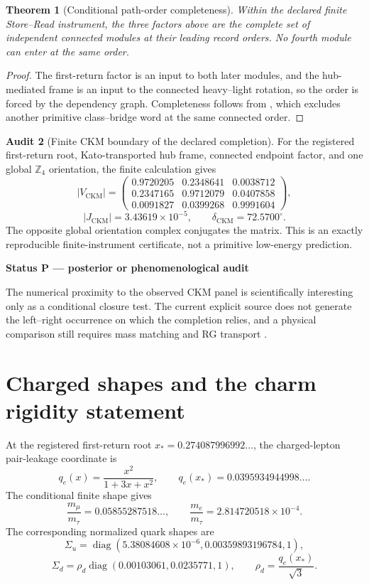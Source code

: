 \documentclass[11pt,oneside,openany]{book}
\numberwithin{equation}{chapter}
\newtheorem{theorem}{Theorem}[chapter]
\theoremstyle{definition}
\newtheorem{audit}[theorem]{Audit}
\theoremstyle{remark}
\newcommand{\diag}{\operatorname{diag}}
\newcommand{\Zfour}{\mathbb Z_4}
\newcommand{\CKM}{\mathrm{CKM}}
\newenvironment{statusbox}[2]{%
  \par\medskip\noindent
  \begin{center}\begin{minipage}{0.94\textwidth}
  \colorbox{#1!8}{\parbox{\dimexpr\linewidth-2\fboxsep\relax}{\textbf{#2}}}\par\smallskip
}{%
  \end{minipage}\end{center}\medskip
}
\newcommand{\Posterior}[1]{\begin{statusbox}{PostColor}{Status P --- posterior or phenomenological audit}#1\end{statusbox}}
\begin{document}
\begin{theorem}[Conditional path-order completeness]
\label{thm:conditional-ckm-order}
Within the declared finite Store--Read instrument, the three factors above
are the complete set of independent connected modules at their leading
record orders.  No fourth module can enter at the same order.
\end{theorem}

\begin{proof}
The first-return factor is an input to both later modules, and the
hub-mediated frame is an input to the connected heavy--light rotation, so
the order is forced by the dependency graph.  Completeness follows from
, which excludes another primitive
class--bridge word at the same connected order.
\end{proof}

\begin{audit}[Finite CKM boundary of the declared completion]
\label{audit:conditional-ckm}
For the registered first-return root, Kato-transported hub frame, connected
endpoint factor, and one global \(\Zfour\) orientation, the finite
calculation gives
\[
 |V_{\CKM}|
 =
 \begin{pmatrix}
 0.9720205&0.2348641&0.0038712\\
 0.2347165&0.9712079&0.0407858\\
 0.0091827&0.0399268&0.9991604
 \end{pmatrix},
\]
\[
 |J_{\CKM}|=3.43619\times10^{-5},
 \qquad
 \delta_{\CKM}=72.5700^\circ.
\]
The opposite global orientation complex conjugates the matrix.  This is an
exactly reproducible finite-instrument certificate, not a primitive
low-energy prediction.
\end{audit}

\Posterior{The numerical proximity to the observed CKM panel is scientifically
interesting only as a conditional closure test.  The current explicit source
does not generate the left--right occurrence on which the completion relies,
and a physical comparison still requires mass matching and RG transport
\cite{PDG2024}.}

\section{Charged shapes and the charm rigidity statement}

At the registered first-return root \(x_*=0.274087996992\ldots\), the
charged-lepton pair-leakage coordinate is
\[
 q_e(x)=\frac{x^2}{1+3x+x^2},
 \qquad
 q_e(x_*)=0.0395934944998\ldots.
\]
The conditional finite shape gives
\[
 \frac{m_\mu}{m_\tau}=0.05855287518\ldots,
 \qquad
 \frac{m_e}{m_\tau}=2.814720518\times10^{-4}.
\]
The corresponding normalized quark shapes are
\[
 \Sigma_u
 =\diag(5.38084608\times10^{-6},
        0.00359893196784,1),
\]
\[
 \Sigma_d
 =\rho_d\diag(0.00103061,0.0235771,1),
 \qquad
 \rho_d=\frac{q_e(x_*)}{\sqrt3}.
\]
\end{document}
